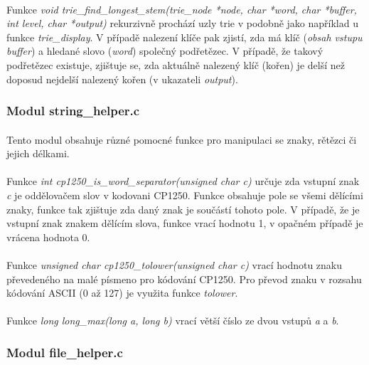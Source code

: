﻿\documentclass[12pt, a4paper]{article}
\begin{document}
\paragraph{}
Funkce \textit{void trie\_find\_longest\_stem(trie\_node *node, char *word, char *buffer, int level, char *output)} rekurzivně prochází uzly trie v podobně jako například u funkce \textit{trie\_display}. V případě nalezení klíče pak zjistí, zda má klíč (\textit{obsah vstupu buffer}) a hledané slovo (\textit{word}) společný podřetězec. V případě, že takový podřetězec existuje, zjištuje se, zda aktuálně nalezený klíč (kořen) je delší než doposud nejdelší nalezený kořen (v ukazateli \textit{output}).

\subsubsection{Modul string\_helper.c}
\paragraph{}
Tento modul obsahuje různé pomocné funkce pro manipulaci se znaky, rětězci či jejich délkami.

\paragraph{}
Funkce \textit{int cp1250\_is\_word\_separator(unsigned char c)} určuje zda vstupní znak \textit{c} je oddělovačem slov v kodovani CP1250. Funkce obsahuje pole se všemi dělícími znaky, funkce tak zjištuje zda daný znak je součástí tohoto pole. V případě, že je vstupní znak znakem dělícím slova, funkce vrací hodnotu 1, v opačném případě je vrácena hodnota 0. 

\paragraph{}
Funkce \textit{unsigned char cp1250\_tolower(unsigned char c)} vrací hodnotu znaku převedeného na malé písmeno pro kódování CP1250. Pro převod znaku v rozsahu kódování ASCII (0 až 127) je využita funkce \textit{tolower}.

\paragraph{}
Funkce \textit{long long\_max(long a, long b)} vrací větší číslo ze dvou vstupů \textit{a} a \textit{b}.
 

\subsubsection{Modul file\_helper.c}
\end{document}
